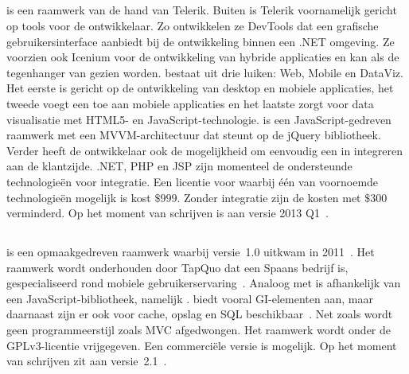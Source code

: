 \subsection{\kendo} %
\kendo{} is een raamwerk van de hand van Telerik.
Buiten \kendo{} is Telerik voornamelijk gericht op tools voor de ontwikkelaar.
Zo ontwikkelen ze DevTools dat een grafische gebruikersinterface aanbiedt bij de ontwikkeling binnen een .NET omgeving.
Ze voorzien ook Icenium voor de ontwikkeling van hybride applicaties en kan als de tegenhanger van \kendo{} gezien worden.
\kendo{} bestaat uit drie luiken:  Web, Mobile en DataViz.  
Het eerste is gericht op de ontwikkeling van desktop en mobiele applicaties,  het tweede voegt een  toe aan mobiele applicaties en het laatste zorgt voor data visualisatie met HTML5- en JavaScript-technologie.
\kendo{} is een JavaScript-gedreven raamwerk met een MVVM-architectuur dat steunt op de jQuery bibliotheek.
Verder heeft de ontwikkelaar ook de mogelijkheid om eenvoudig een  in integreren aan de klantzijde.
.NET,  PHP en JSP zijn momenteel de ondersteunde technologieën voor  integratie.
Een licentie voor \kendo{} waarbij één van voornoemde technologieën mogelijk is kost $\$999$.
Zonder  integratie zijn de kosten met $\$300$ verminderd.
Op het moment van schrijven is \kendo{} aan versie 2013 Q1~\cite{Telerik}. 


\subsection{\lungo} %
\lungo{} is een opmaakgedreven raamwerk waarbij versie~1.0 uitkwam in 2011~\cite{TapQuo2011}.
Het raamwerk wordt onderhouden door TapQuo dat een Spaans bedrijf is, gespecialiseerd rond mobiele gebruikerservaring~\cite{TapQuo2013a}.
Analoog met \jqm{} is \lungo{} afhankelijk van een JavaScript-bibliotheek, namelijk \quo{}.
\lungo{} biedt vooral GI-elementen aan, maar daarnaast zijn er ook  voor cache, opslag en SQL beschikbaar~\cite{TapQuo2013}.
Net zoals \jqm{} wordt geen programmeerstijl zoals MVC afgedwongen.
Het raamwerk wordt onder de GPLv3-licentie vrijgegeven.
Een commerciële versie is mogelijk.
Op het moment van schrijven zit \lungo{} aan versie~2.1~\cite{TapQuo2013}.



\subsection{\tmp} %

